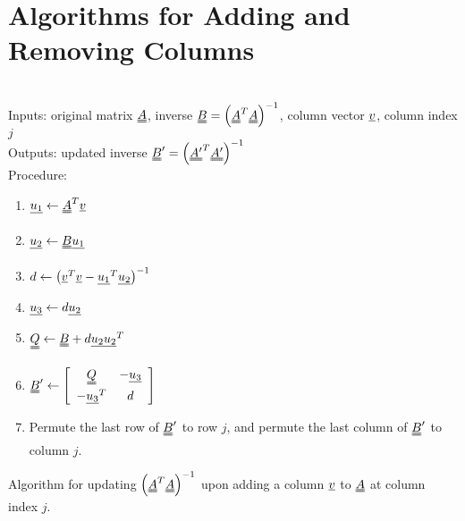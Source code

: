 \documentclass[11pt]{article} %
\begin{document}
\section{Algorithms for Adding and Removing Columns}
\begin{algorithm}
\hrulefill \\
Inputs: original matrix $\uuline{A}$, inverse $\uuline{B} = \left(\uuline{A}^T \uuline{A}\right)^{-1}$, column vector $\uline{v}$, column index $j$\\
Outputs: updated inverse $\uuline{B}' = \left(\uuline{A'}^T \uuline{A'}\right)^{-1}$\\
Procedure:
\begin{enumerate}
\item $\uline{u_1} \leftarrow \uuline{A}^T \uline{v}$
\item $\uline{u_2} \leftarrow \uuline{B} \uline{u_1}$
\item $d \leftarrow \left( \uline{v}^T\uline{v} - \uline{u_1}^T\uline{u_2} \right)^{-1}$
\item $\uline{u_3} \leftarrow d \uline{u_2}$
\item $\uuline{Q} \leftarrow \uuline{B} + d\uline{u_2}\uline{u_2}^T$
\item $\uuline{B}' \leftarrow \left[ \begin{array}{cc} \uuline{Q} & -\uline{u_3}\\ -\uline{u_3}^T & d \\\end{array} \right]$
\item Permute the last row of $\uuline{B}'$ to row $j$, and permute the last column of $\uuline{B}'$ to column $j$.
\end{enumerate}
\hrulefill
\caption{Algorithm for updating $\left(\uuline{A}^T\uuline{A}\right)^{-1}$ upon adding a column $\uline{v}$ to $\uuline{A}$ at column index $j$.}
\end{algorithm}
\end{document}
